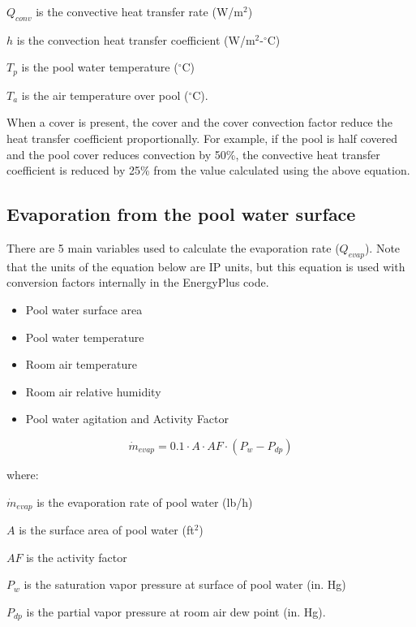 \(Q_{conv}\) is the convective heat transfer rate (W/m\(^2\))

\(h\) is the convection heat transfer coefficient (W/m\(^2\)-\(^{\circ}\)C)

\(T_p\) is the pool water temperature (\(^{\circ}\)C)

\(T_a\) is the air temperature over pool (\(^{\circ}\)C).

When a cover is present, the cover and the cover convection factor reduce the heat transfer coefficient proportionally. For example, if the pool is half covered and the pool cover reduces convection by 50\%, the convective heat transfer coefficient is reduced by 25\% from the value calculated using the above equation.

\subsection{Evaporation from the pool water surface}\label{evaporation-from-the-pool-water-surface}

There are 5 main variables used to calculate the evaporation rate (\(Q_{evap}\)).  Note that the units of the equation below are IP units, but this equation is used with conversion factors internally in the EnergyPlus code.

\begin{itemize}
\tightlist
\item
  Pool water surface area
\item
  Pool water temperature
\item
  Room air temperature
\item
  Room air relative humidity
\item
  Pool water agitation and Activity Factor
\end{itemize}

\begin{equation}
\dot{m}_{evap} = 0.1 \cdot A \cdot AF \cdot (P_w - P_{dp})
\end{equation}

where:

\(\dot{m}_{evap}\) is the evaporation rate of pool water (lb/h)

\(A\) is the surface area of pool water (ft\(^2\))

\(AF\) is the activity factor

\(P_w\) is the saturation vapor pressure at surface of pool water (in. Hg)

\(P_{dp}\) is the partial vapor pressure at room air dew point (in. Hg).



